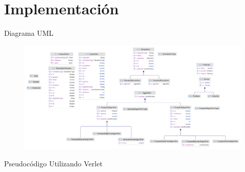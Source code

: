 \section{Implementación}\label{sec:implementacion}

\begin{frame}{Diagrama UML}
    \begin{figure}[H]
        \centering
        \includegraphics[width=1\linewidth]{pic/03-impl/UML}\label{fig:figure-uml}
    \end{figure}
\end{frame}

\begin{frame}{Pseudocódigo}
    Utilizando Verlet
    \footnotesize{
        \begin{algorithmic}
                \State {}
                \State {}
                \State {}
                \State {}
                \State {}
            \EndWhile
        \end{algorithmic}
    }
\end{frame}

